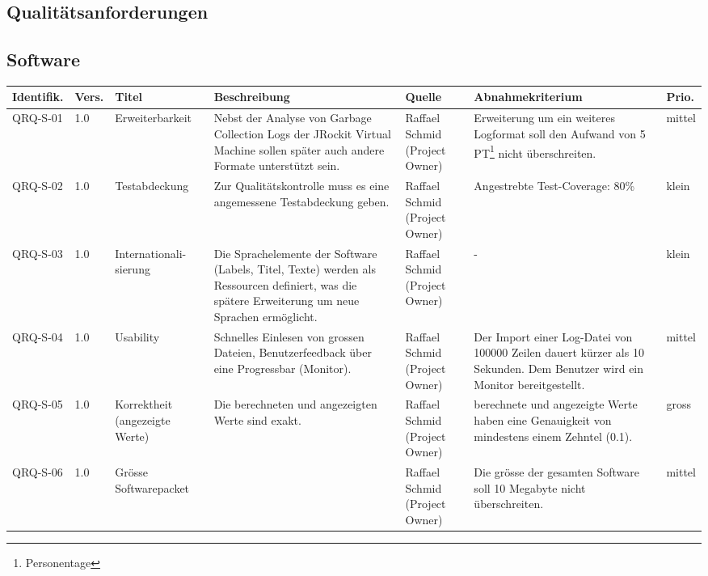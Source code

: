 \begin{landscape}
\section{Qualitätsanforderungen}
\subsection{Software}\label{anforderungen_software}
\begin{longtable}{|p{1.6cm}|p{0.7cm}|p{2.5cm}|p{4.5cm}|p{2.6cm}|p{4cm}|p{0.9cm}|}
    \hline
    \textbf{Identifik.} & \textbf{Vers.}& \textbf{Titel} & \textbf{Beschreibung} & \textbf{Quelle} & \textbf{Abnahmekriterium} & \textbf{Prio.}\\\hline
   QRQ-S-01 & 1.0 & Erweiterbarkeit & Nebst der Analyse von Garbage Collection Logs der JRockit Virtual Machine sollen später auch andere Formate unterstützt sein. & Raffael Schmid (Project Owner) & Erweiterung um ein weiteres Logformat soll den Aufwand von 5 PT\footnote{Personentage} nicht überschreiten. & mittel \\\hline
   QRQ-S-02 & 1.0 & Testabdeckung & Zur Qualitätskontrolle muss es eine angemessene Testabdeckung geben. & Raffael Schmid (Project Owner) & Angestrebte Test-Coverage: 80\% & klein \\\hline

  QRQ-S-03 & 1.0 & Internationali-sierung & Die Sprachelemente der Software (Labels, Titel, Texte) werden als Ressourcen definiert, was die spätere Erweiterung um neue Sprachen ermöglicht. & Raffael Schmid (Project Owner) & - & klein\\\hline

   QRQ-S-04 & 1.0 & Usability & Schnelles Einlesen von grossen Dateien, Benutzerfeedback über eine Progressbar (Monitor). & Raffael Schmid (Project Owner) & Der Import einer Log-Datei von 100000 Zeilen dauert kürzer als 10 Sekunden. Dem Benutzer wird ein Monitor bereitgestellt.&mittel \\\hline

  QRQ-S-05 & 1.0 & Korrektheit (angezeigte Werte) & Die berechneten und angezeigten Werte sind exakt. & Raffael Schmid (Project Owner) & berechnete und angezeigte Werte haben eine Genauigkeit von mindestens einem Zehntel (0.1). & gross\\\hline
  
QRQ-S-06 & 1.0 & Grösse Softwarepacket & & Raffael Schmid (Project Owner) & Die grösse der gesamten Software soll 10 Megabyte nicht überschreiten. & mittel\\\hline


\end{longtable}
\end{landscape}
